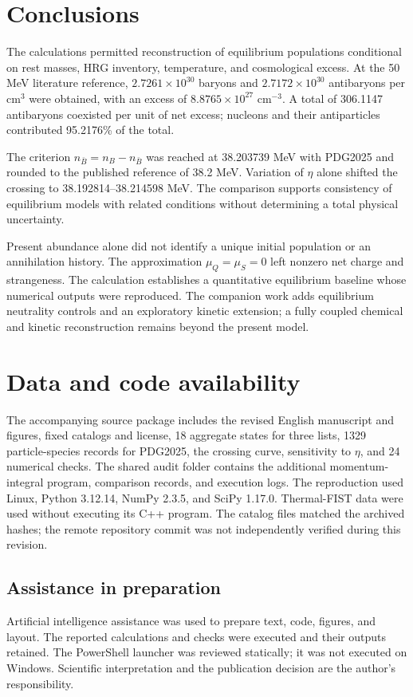 \section{Conclusions}
The calculations permitted reconstruction of equilibrium populations conditional on rest masses, HRG inventory, temperature, and cosmological excess. At the 50 MeV literature reference, $2.7261\times10^{30}$ baryons and $2.7172\times10^{30}$ antibaryons per cm$^3$ were obtained, with an excess of $8.8765\times10^{27}$ cm$^{-3}$. A total of 306.1147 antibaryons coexisted per unit of net excess; nucleons and their antiparticles contributed 95.2176\% of the total.

The criterion $n_{\bar B}=n_B-n_{\bar B}$ was reached at 38.203739 MeV with PDG2025 and rounded to the published reference of 38.2 MeV. Variation of $\eta$ alone shifted the crossing to 38.192814--38.214598 MeV. The comparison supports consistency of equilibrium models with related conditions without determining a total physical uncertainty.

Present abundance alone did not identify a unique initial population or an annihilation history. The approximation $\mu_Q=\mu_S=0$ left nonzero net charge and strangeness. The calculation establishes a quantitative equilibrium baseline whose numerical outputs were reproduced. The companion work adds equilibrium neutrality controls and an exploratory kinetic extension; a fully coupled chemical and kinetic reconstruction remains beyond the present model.

\clearpage
\section*{Data and code availability}
The accompanying source package includes the revised English manuscript and figures, fixed catalogs and license, 18 aggregate states for three lists, 1329 particle-species records for PDG2025, the crossing curve, sensitivity to $\eta$, and 24 numerical checks. The shared audit folder contains the additional momentum-integral program, comparison records, and execution logs. The reproduction used Linux, Python 3.12.14, NumPy 2.3.5, and SciPy 1.17.0. Thermal-FIST data were used without executing its C++ program. The catalog files matched the archived hashes; the remote repository commit was not independently verified during this revision.

\begin{samepage}
\section*{Assistance in preparation}
Artificial intelligence assistance was used to prepare text, code, figures, and layout. The reported calculations and checks were executed and their outputs retained. The PowerShell launcher was reviewed statically; it was not executed on Windows. Scientific interpretation and the publication decision are the author's responsibility.
\end{samepage}
